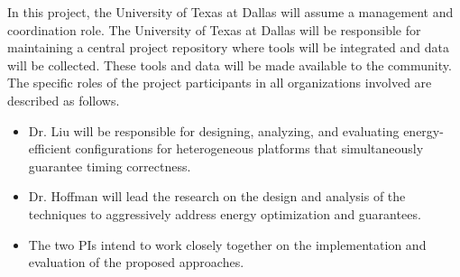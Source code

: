 \documentclass[10pt,letterpaper]{article}
\begin{document}
 In this project, the University of Texas at Dallas will assume a management and coordination role. The University of Texas at Dallas will be responsible for maintaining a central project repository where tools will be integrated and data will be collected. These tools and data will be made available to the community. The specific roles of the project participants in all organizations involved are described as follows.
\begin{itemize}
\item Dr. Liu will be responsible for designing, analyzing, and evaluating energy-efficient configurations for heterogeneous platforms that simultaneously guarantee timing correctness.
\item Dr. Hoffman will lead the research on the design and analysis of the techniques to aggressively address energy optimization and guarantees. 
\item The two PIs intend to  work closely together on the implementation and evaluation of the proposed approaches.
\end{itemize}


\end{document}
